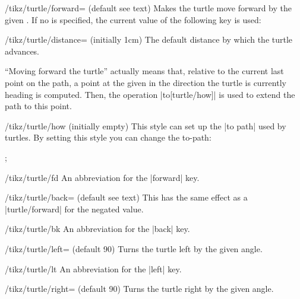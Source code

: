 \begin{key}{/tikz/turtle/forward= (default \normalfont see text)}
    Makes the turtle move forward by the given . If no
     is specified, the current value of the following key is
    used:
    \begin{key}{/tikz/turtle/distance= (initially 1cm)}
        The default distance by which the turtle advances.
    \end{key}
    ``Moving forward the turtle'' actually means that, relative to the current
    last point on the path, a point at the given  in the
    direction the turtle is currently heading is computed. Then, the operation
    |to[turtle/how]| is used to extend the path to this point.
    \begin{stylekey}{/tikz/turtle/how (initially \normalfont empty)}
        This style can set up the |to path| used by turtles. By setting this
        style you can change the to-path:
\begin{codeexample}[preamble={\usetikzlibrary{turtle}}]
\tikz \draw [turtle={how/.style={bend left},home,forward,right,forward}];
\end{codeexample}
    \end{stylekey}
\end{key}

\begin{key}{/tikz/turtle/fd}
    An abbreviation for the |forward| key.
\end{key}

\begin{key}{/tikz/turtle/back= (default \normalfont see text)}
    This has the same effect as a |turtle/forward| for the negated
     value.
\end{key}

\begin{key}{/tikz/turtle/bk}
    An abbreviation for the |back| key.
\end{key}

\begin{key}{/tikz/turtle/left= (default 90)}
    Turns the turtle left by the given angle.
\end{key}

\begin{key}{/tikz/turtle/lt}
    An abbreviation for the |left| key.
\end{key}

\begin{key}{/tikz/turtle/right= (default 90)}
    Turns the turtle right by the given angle.
\end{key}

